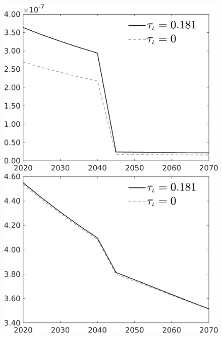 \documentclass[12pt]{article}
\begin{document}
\begin{figure}[h!!]
\begin{minipage}[]{0.32\textwidth}
\end{minipage}	
\begin{minipage}[]{0.32\textwidth}
\includegraphics[width=1\textwidth]{../../codding_model/own_basedOnFried/optimalPol_010922_revision/figures/all_13Sept22/CompTauf_bytaul_Reg0_gAf_spillover0_nsk0_xgr0_knspil0_sep0_LFlimit1_emsbase0_countec0_GovRev0_etaa0.79_lgd1.png}
\end{minipage}	
\begin{minipage}[]{0.32\textwidth}
\includegraphics[width=1\textwidth]{../../codding_model/own_basedOnFried/optimalPol_010922_revision/figures/all_13Sept22/CompTauf_bytaul_Reg0_gAn_spillover0_nsk0_xgr0_knspil0_sep0_LFlimit1_emsbase0_countec0_GovRev0_etaa0.79_lgd1.png}

\end{minipage}
\end{figure}
\end{document}
